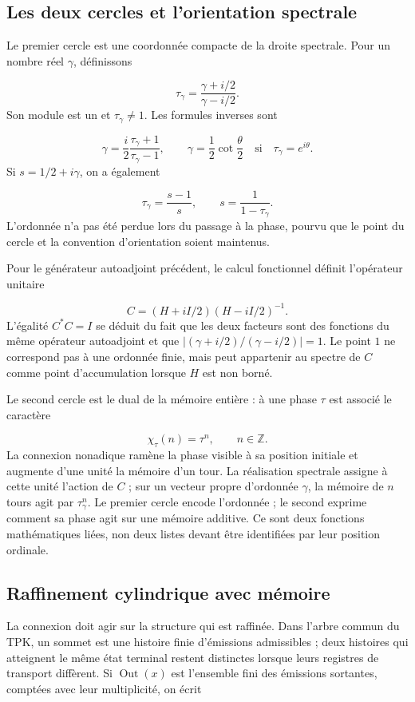 \subsection{Les deux cercles et l’orientation spectrale}
\label{rz:circulos}
Le premier cercle est une coordonnée compacte de la droite spectrale. Pour un nombre réel \(\gamma\), définissons

\[
\tau_\gamma=\frac{\gamma+i/2}{\gamma-i/2}.
\]
Son module est un et \(\tau_\gamma\neq1\). Les formules inverses sont

\[
\gamma=\frac{i}{2}\frac{\tau_\gamma+1}{\tau_\gamma-1},
\qquad
\gamma=\frac12\cot\frac{\theta}{2}
\quad\text{si}\quad\tau_\gamma=e^{i\theta}.
\]
Si \(s=1/2+i\gamma\), on a également

\[
\tau_\gamma=\frac{s-1}{s},\qquad s=\frac1{1-\tau_\gamma}.
\]
L’ordonnée n’a pas été perdue lors du passage à la phase, pourvu que le point du cercle et la convention d’orientation soient maintenus.

Pour le générateur autoadjoint précédent, le calcul fonctionnel définit l'opérateur unitaire

\[
C=(H+iI/2)(H-iI/2)^{-1}.
\]
L'égalité \(C^*C=I\) se déduit du fait que les deux facteurs sont des fonctions du même opérateur autoadjoint et que \(|(\gamma+i/2)/(\gamma-i/2)|=1\). Le point \(1\) ne correspond pas à une ordonnée finie, mais peut appartenir au spectre de \(C\) comme point d'accumulation lorsque \(H\) est non borné.

Le second cercle est le dual de la mémoire entière : à une phase \(\tau\) est associé le caractère

\[
\chi_\tau(n)=\tau^n,\qquad n\in\mathbb Z.
\]
La connexion nonadique ramène la phase visible à sa position initiale et augmente d’une unité la mémoire d’un tour. La réalisation spectrale assigne à cette unité l’action de \(C\) ; sur un vecteur propre d’ordonnée \(\gamma\), la mémoire de \(n\) tours agit par \(\tau_\gamma^n\). Le premier cercle encode l’ordonnée ; le second exprime comment sa phase agit sur une mémoire additive. Ce sont deux fonctions mathématiques liées, non deux listes devant être identifiées par leur position ordinale.

\subsection{Raffinement cylindrique avec mémoire}
\label{rz:refinamiento}
La connexion doit agir sur la structure qui est raffinée. Dans l'arbre commun du TPK, un sommet est une histoire finie d'émissions admissibles ; deux histoires qui atteignent le même état terminal restent distinctes lorsque leurs registres de transport diffèrent. Si \(\operatorname{Out}(x)\) est l'ensemble fini des émissions sortantes, comptées avec leur multiplicité, on écrit

